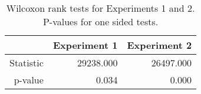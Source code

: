 \begin{table}[ht]
\centering
\begin{tabular}{rrr}
  \hline
 & Experiment 1 & Experiment 2 \\ 
  \hline
Statistic & 29238.000 & 26497.000 \\ 
  p-value & 0.034 & 0.000 \\ 
   \hline
\end{tabular}
\caption{Wilcoxon rank tests for Experiments 1
             and 2. P-values for one sided tests.} 
\label{tab:np_res}
\end{table}
